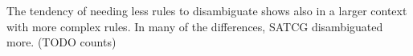 \documentclass[11pt]{article}
\begin{document}
The tendency of needing less rules to disambiguate shows also in a larger context with more complex rules.
In many of the differences, SATCG disambiguated more. (TODO counts)






\end{document}
